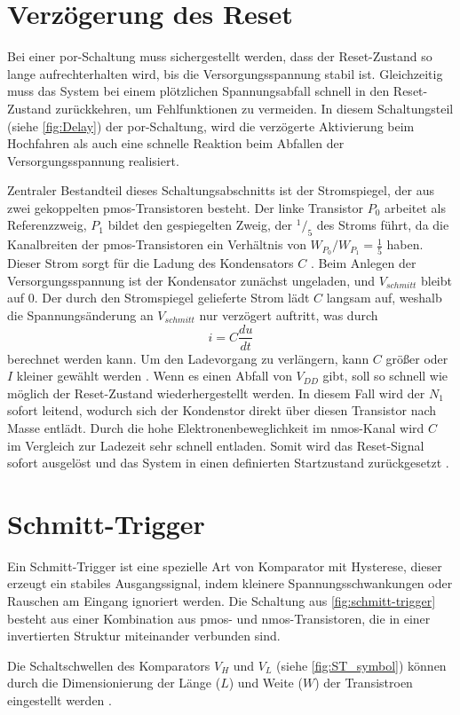 \section{Verzögerung des Reset}
Bei einer \gls{por}-Schaltung muss sichergestellt werden, dass der Reset-Zustand so lange aufrechterhalten wird, bis die Versorgungsspannung stabil ist. Gleichzeitig muss das System bei einem plötzlichen Spannungsabfall schnell in den Reset-Zustand zurückkehren, um Fehlfunktionen zu vermeiden. In diesem Schaltungsteil (siehe \autoref{fig:Delay}) der \gls{por}-Schaltung, wird die verzögerte Aktivierung beim Hochfahren als auch eine schnelle Reaktion beim Abfallen der Versorgungsspannung realisiert.

Zentraler Bestandteil dieses Schaltungsabschnitts ist der Stromspiegel, der aus zwei gekoppelten \gls{pmos}-Transistoren besteht. Der linke Transistor $P_0$ arbeitet als Referenzzweig, $P_1$ bildet den gespiegelten Zweig, der $^1/_5$ des Stroms führt, da die Kanalbreiten der \gls{pmos}-Transistoren ein Verhältnis von ${W_{P_0}}/{W_{P_1}} = \frac{1}{5}$ haben. Dieser Strom sorgt für die Ladung des Kondensators $C$ \cite{CircuitDesigLayoutAndSimulation}. Beim Anlegen der Versorgungsspannung ist der Kondensator zunächst ungeladen, und $V_{schmitt}$ bleibt auf 0. Der durch den Stromspiegel gelieferte Strom lädt $C$ langsam auf, weshalb die Spannungsänderung an $V_{schmitt}$ nur verzögert auftritt, was durch 
\begin{equation}
    i = C \frac{du}{dt}
\end{equation}
berechnet werden kann. Um den Ladevorgang zu verlängern, kann $C$ größer oder $I$ kleiner gewählt werden \cite{MicroelectronicCircuits}\cite{DesignOfAnalogCMOSIntegratedCircuits}. Wenn es einen Abfall von $V_{DD}$ gibt, soll so schnell wie möglich der Reset-Zustand wiederhergestellt werden. In diesem Fall wird der $N_1$ sofort leitend, wodurch sich der Kondenstor direkt über diesen Transistor nach Masse entlädt. Durch die hohe Elektronenbeweglichkeit im \gls{nmos}-Kanal wird $C$ im Vergleich zur Ladezeit sehr schnell entladen. Somit wird das Reset-Signal sofort ausgelöst und das System in einen definierten Startzustand zurückgesetzt \cite{ElectronicDevices}. 

\section{Schmitt-Trigger}
Ein Schmitt-Trigger ist eine spezielle Art von Komparator mit Hysterese, dieser erzeugt ein stabiles Ausgangssignal, indem kleinere Spannungsschwankungen oder Rauschen am Eingang ignoriert werden. Die Schaltung aus \autoref{fig:schmitt-trigger} besteht aus einer Kombination aus \gls{pmos}- und \gls{nmos}-Transistoren, die in einer invertierten Struktur miteinander verbunden sind. 

Die Schaltschwellen des Komparators $V_H$ und $V_L$ (siehe \autoref{fig:ST_symbol}) können durch die Dimensionierung der Länge ($L$) und Weite ($W$) der Transistroen eingestellt werden \cite{CircuitDesigLayoutAndSimulation}\cite{S-Trigger_design}\cite{LowPowerS-Trigger}.  

